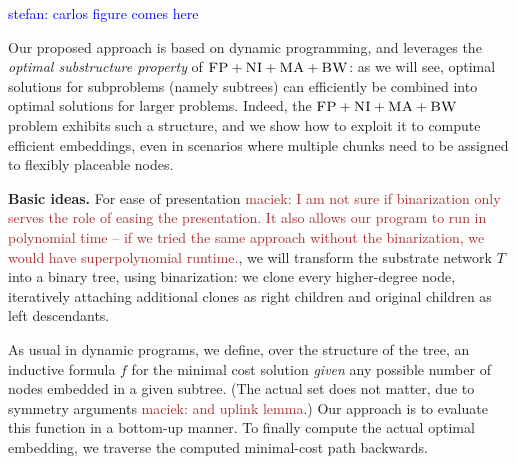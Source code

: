 \documentclass[9pt]{sigcomm-alternate}
\newcommand{\maciek}[1]{\textcolor{brown}{maciek: #1}}
\newcommand{\stefan}[1]{\textcolor{blue}{stefan: #1}}
\newcommand{\CC}{\textsc{NI}}
\newcommand{\FP}{\textsc{FP}}
\newcommand{\BW}{\textsc{BW}}
\newcommand{\MA}{\textsc{MA}}
\newcommand{\Tree}{\ensuremath{T}}
\begin{document}
\stefan{carlos figure comes here}


Our proposed approach is based on dynamic programming, and
leverages the \emph{optimal substructure property} of $\FP+\CC+\MA+\BW$:
as we will see, optimal solutions for subproblems (namely subtrees)
can efficiently be combined into optimal solutions for larger problems.
Indeed, the $\FP+\CC+\MA+\BW$ problem
exhibits such a structure, and we show how to exploit it to
compute efficient embeddings, even in scenarios where multiple chunks
need to be assigned to flexibly placeable nodes.

\textbf{Basic ideas.} For ease of presentation \maciek{I am not sure if binarization only serves the role of easing the presentation. It also allows our program to run in polynomial time -- if we tried the same approach without the binarization, we would have superpolynomial runtime.}, we will transform the substrate network $\Tree$
into a binary tree, using binarization:
we clone every higher-degree node,
iteratively attaching additional clones as right children
and original children as left descendants.

As usual in dynamic programs, we define, over the structure of the tree, an inductive formula $f$ for
the minimal cost solution \emph{given} any possible number of nodes 
embedded in a given subtree. (The actual set does not matter,
due to symmetry arguments \maciek{and uplink lemma}.)
Our approach is to evaluate this function in a bottom-up
manner.
To finally compute the actual optimal embedding,
we traverse the computed minimal-cost path backwards.
\end{document}
